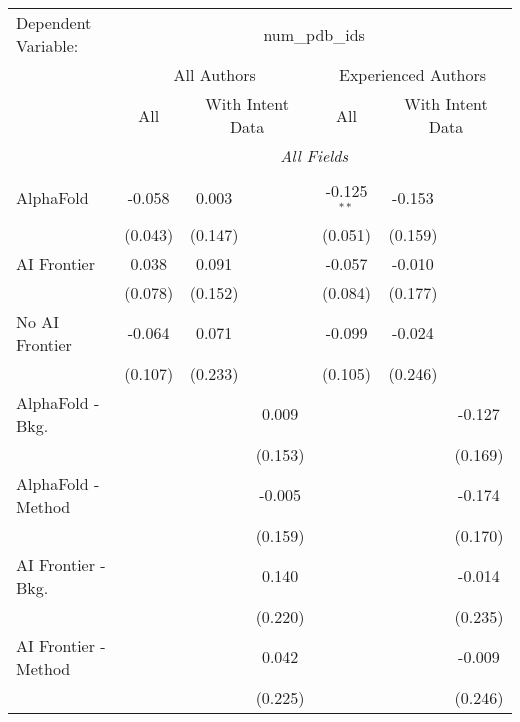 \begingroup
\centering
\begin{tabular}{lcccccc}
   \tabularnewline \midrule \midrule
   Dependent Variable: & \multicolumn{6}{c}{num\_pdb\_ids}\\
 & \multicolumn{3}{c}{All Authors} & \multicolumn{3}{c}{Experienced Authors} \\
\cmidrule(lr){2-4} \cmidrule(lr){5-7}
 & \multicolumn{1}{c}{All} & \multicolumn{2}{c}{With Intent Data} & \multicolumn{1}{c}{All} & \multicolumn{2}{c}{With Intent Data} \\
\cmidrule(lr){2-2} \cmidrule(lr){3-4} \cmidrule(lr){5-5} \cmidrule(lr){6-7}
 & \multicolumn{6}{c}{\textit{All Fields}} \\ \\
   AlphaFold               & -0.058  & 0.003   &         & -0.125$^{**}$ & -0.153  &   \\   
                           & (0.043) & (0.147) &         & (0.051)       & (0.159) &   \\   
   AI Frontier             & 0.038   & 0.091   &         & -0.057        & -0.010  &   \\   
                           & (0.078) & (0.152) &         & (0.084)       & (0.177) &   \\   
   No AI Frontier          & -0.064  & 0.071   &         & -0.099        & -0.024  &   \\   
                           & (0.107) & (0.233) &         & (0.105)       & (0.246) &   \\   
   AlphaFold - Bkg.        &         &         & 0.009   &               &         & -0.127\\   
                           &         &         & (0.153) &               &         & (0.169)\\   
   AlphaFold - Method      &         &         & -0.005  &               &         & -0.174\\   
                           &         &         & (0.159) &               &         & (0.170)\\   
   AI Frontier - Bkg.      &         &         & 0.140   &               &         & -0.014\\   
                           &         &         & (0.220) &               &         & (0.235)\\   
   AI Frontier - Method    &         &         & 0.042   &               &         & -0.009\\   
                           &         &         & (0.225) &               &         & (0.246)\\   

\end{tabular}
